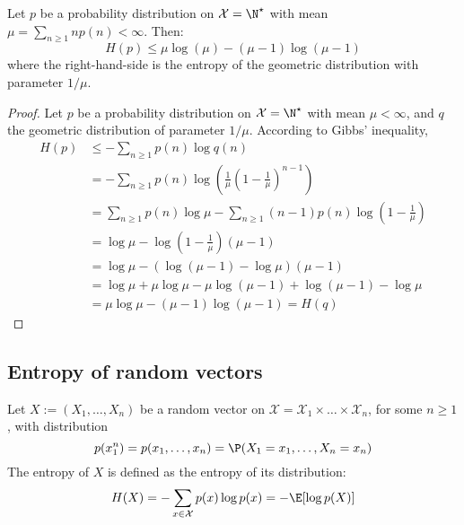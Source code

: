 \documentclass{../cs-classes/cs-classes}
\newcommand*{\X}{\mathcal{X}}
\begin{document}
\begin{corollary}
    Let $p$ be a probability distribution on $\X=\N^\star$ with mean $\mu=\sum_{n\geq 1} np(n) < \infty$. Then:
    \begin{equation*}
        H(p)\leq\mu\log(\mu)-(\mu-1)\log(\mu-1)
    \end{equation*}
    where the right-hand-side is the entropy of the geometric distribution with parameter $1/\mu$.
\end{corollary}

\begin{proof}
    Let $p$ be a probability distribution on $\X=\N^\star$ with mean $\mu<\infty$, and $q$ the geometric distribution of parameter $1/\mu$. According to Gibbs' inequality,
    \begin{equation*}
        \begin{aligned}
            H(p)&\leq-\sum_{n\geq 1}p(n)\log q(n) \\
            &=-\sum_{n\geq 1}p(n)\log\left(\frac{1}{\mu}\left(1-\frac{1}{\mu}\right)^{n-1}\right)\\
            &=\sum_{n\geq 1}p(n)\log \mu - \sum_{n\geq 1}(n-1) p(n)\log\left(1-\frac{1}{\mu}\right) \\
            &=\log\mu - \log\left(1-\frac{1}{\mu}\right)\left(\mu - 1\right)\\
            &=\log\mu - \left(\log(\mu-1)-\log\mu\right)\left(\mu - 1\right)\\
            &=\log\mu + \mu\log\mu - \mu\log(\mu-1) + \log(\mu-1) - \log\mu\\
            &=\mu\log\mu - (\mu-1)\log(\mu-1) = H(q)
        \end{aligned}
    \end{equation*}
\end{proof}

\subsection{Entropy of random vectors}
\begin{definition}
    Let $X:=(X_1, \dots, X_n)$ be a random vector on $\X=\X_1\times \dots \times \X_n$, for some $n\geq 1$, with distribution
    \begin{equation*}
        p(x_1^n)=p(x_1, \dots, x_n) = \P(X_1=x_1, \dots, X_n=x_n)
    \end{equation*}
    The entropy of $X$ is defined as the entropy of its distribution:
    \begin{equation}
        H(X)=-\sum_{x\in \X}p(x)\log p(x) = -\E[\log p(X)]
    \end{equation}
\end{definition}
\end{document}
